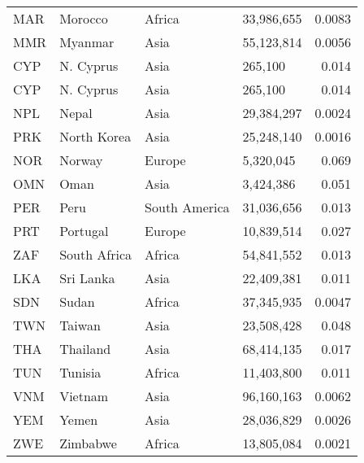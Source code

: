 \begin{table}
\begin{tabular}{llllr}
        MAR     & Morocco      & Africa        & 33,986,655  & 0.0083        \\
        MMR     & Myanmar      & Asia          & 55,123,814  & 0.0056        \\
        CYP     & N. Cyprus    & Asia          & 265,100     & 0.014         \\
        CYP     & N. Cyprus    & Asia          & 265,100     & 0.014         \\
        NPL     & Nepal        & Asia          & 29,384,297  & 0.0024        \\
        PRK     & North Korea  & Asia          & 25,248,140  & 0.0016        \\
        NOR     & Norway       & Europe        & 5,320,045   & 0.069         \\
        OMN     & Oman         & Asia          & 3,424,386   & 0.051         \\
        PER     & Peru         & South America & 31,036,656  & 0.013         \\
        PRT     & Portugal     & Europe        & 10,839,514  & 0.027         \\
        ZAF     & South Africa & Africa        & 54,841,552  & 0.013         \\
        LKA     & Sri Lanka    & Asia          & 22,409,381  & 0.011         \\
        SDN     & Sudan        & Africa        & 37,345,935  & 0.0047        \\
        TWN     & Taiwan       & Asia          & 23,508,428  & 0.048         \\
        THA     & Thailand     & Asia          & 68,414,135  & 0.017         \\
        TUN     & Tunisia      & Africa        & 11,403,800  & 0.011         \\
        VNM     & Vietnam      & Asia          & 96,160,163  & 0.0062        \\
        YEM     & Yemen        & Asia          & 28,036,829  & 0.0026        \\
        ZWE     & Zimbabwe     & Africa        & 13,805,084  & 0.0021        \\
        \bottomrule
    \end{tabular}
\end{table}

